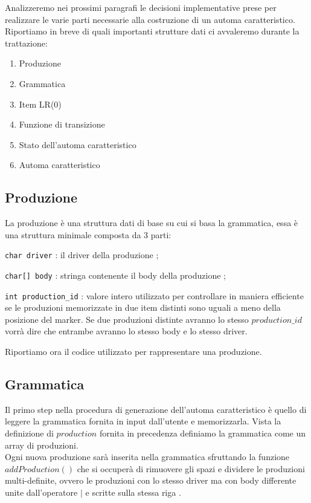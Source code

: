 \documentclass[12pt]{article}
\begin{document}
Analizzeremo nei prossimi paragrafi le decisioni implementative prese per realizzare le varie parti necessarie alla costruzione di un automa caratteristico. Riportiamo in breve di quali importanti strutture dati ci avvaleremo durante la trattazione:
\begin{enumerate}
\item Produzione
\item Grammatica
\item Item LR(0)
\item Funzione di transizione
\item Stato dell'automa caratteristico
\item Automa caratteristico
\end{enumerate}

\subsection{Produzione}
La produzione è una struttura dati di base su cui si basa la grammatica, essa è una struttura minimale composta da 3 parti:
\begin{list}{-}{}
\item \texttt{char driver} : il driver della produzione ;
\item \texttt{char[] body} : stringa contenente il body della produzione ;
\item \texttt{int production\_id} : valore intero utilizzato per controllare in maniera efficiente se le produzioni memorizzate in due item distinti sono uguali a meno della posizione del marker. Se due produzioni distinte avranno lo stesso $production\_id$ vorrà dire che entrambe avranno lo stesso body e lo stesso driver.
\end{list}

Riportiamo ora il codice utilizzato per rappresentare una produzione.


\subsection{Grammatica}
Il primo step nella procedura di generazione dell'automa caratteristico è quello di leggere la grammatica fornita in input dall'utente e memorizzarla. Vista la definizione di $production$ fornita in precedenza definiamo la grammatica come un array di produzioni.\\

Ogni nuova produzione sarà inserita nella grammatica sfruttando la funzione $addProduction()$ che si occuperà di rimuovere gli spazi e dividere le produzioni multi-definite, ovvero le produzioni con lo stesso driver ma con body differente unite dall'operatore $|$ e scritte sulla stessa riga . \\
\end{document}
